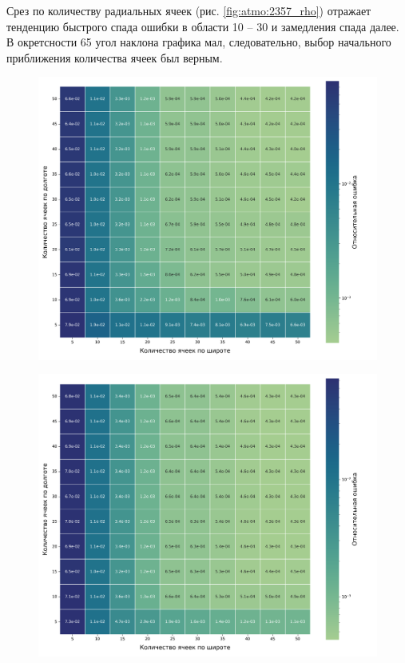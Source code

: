  Срез по количеству радиальных ячеек (рис. \ref{fig:atmo:2357_rho}) отражает тенденцию быстрого спада ошибки в области
 10 -- 30 и замедления спада далее. В окретсности 65 угол наклона графика мал, следовательно,
 выбор начального приближения количества ячеек был верным.

 \begin{figure}[h!]
    \centering
    \includegraphics[width=0.85\linewidth]{../images/solution/atmo/2357_heatmap.png}
    \label{fig:atmo:2357_heatmap}
 \end{figure}

 \begin{figure}[h!]
    \centering
    \includegraphics[width=0.85\linewidth]{../images/solution/atmo/2375_heatmap.png}
    \label{fig:atmo:2375_heatmap}
 \end{figure}

